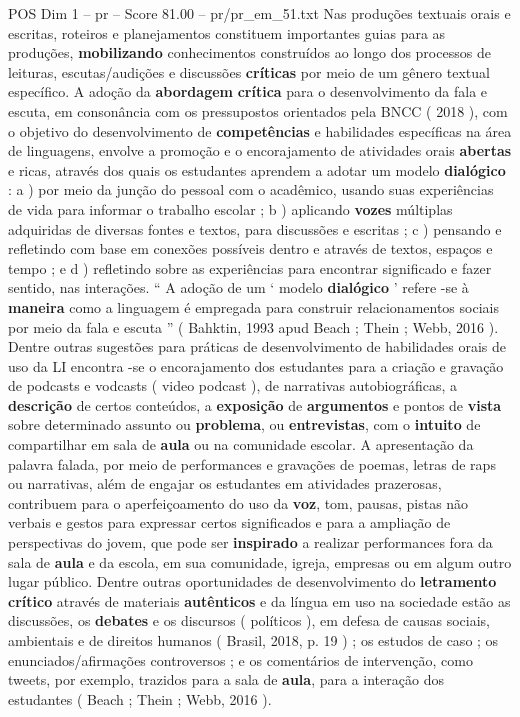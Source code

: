 \begin{textsample}{POS Dim 1 – pr – Score 81.00 – pr/pr\_em\_51.txt}
Nas produções textuais orais e escritas, roteiros e planejamentos constituem importantes guias para as produções, \textbf{mobilizando} conhecimentos construídos ao longo dos processos de leituras, escutas/audições e discussões \textbf{críticas} por meio de um gênero textual específico.
A adoção da \textbf{abordagem} \textbf{crítica} para o desenvolvimento da fala e escuta, em consonância com os pressupostos orientados pela BNCC ( 2018 ), com o objetivo do desenvolvimento de \textbf{competências} e habilidades específicas na área de linguagens, envolve a promoção e o encorajamento de atividades orais \textbf{abertas} e ricas, através dos quais os estudantes aprendem a adotar um modelo \textbf{dialógico} : a ) por meio da junção do pessoal com o acadêmico, usando suas experiências de vida para informar o trabalho escolar ; b ) aplicando \textbf{vozes} múltiplas adquiridas de diversas fontes e textos, para discussões e escritas ; c ) pensando e refletindo com base em conexões possíveis dentro e através de textos, espaços e tempo ; e d ) refletindo sobre as experiências para encontrar significado e fazer sentido, nas interações. “ A adoção de um ‘ modelo \textbf{dialógico} ’ refere -se à \textbf{maneira} como a linguagem é empregada para construir relacionamentos sociais por meio da fala e escuta ” ( Bahktin, 1993 apud Beach ; Thein ; Webb, 2016 ).
Dentre outras sugestões para práticas de desenvolvimento de habilidades orais de uso da LI encontra -se o encorajamento dos estudantes para a criação e gravação de podcasts e vodcasts ( video podcast ), de narrativas autobiográficas, a \textbf{descrição} de certos conteúdos, a \textbf{exposição} de \textbf{argumentos} e pontos de \textbf{vista} sobre determinado assunto ou \textbf{problema}, ou \textbf{entrevistas}, com o \textbf{intuito} de compartilhar em sala de \textbf{aula} ou na comunidade escolar.
A apresentação da palavra falada, por meio de performances e gravações de poemas, letras de raps ou narrativas, além de engajar os estudantes em atividades prazerosas, contribuem para o aperfeiçoamento do uso da \textbf{voz}, tom, pausas, pistas não verbais e gestos para expressar certos significados e para a ampliação de perspectivas do jovem, que pode ser \textbf{inspirado} a realizar performances fora da sala de \textbf{aula} e da escola, em sua comunidade, igreja, empresas ou em algum outro lugar público.
Dentre outras oportunidades de desenvolvimento do \textbf{letramento} \textbf{crítico} através de materiais \textbf{autênticos} e da língua em uso na sociedade estão as discussões, os \textbf{debates} e os discursos ( políticos ), em defesa de causas sociais, ambientais e de direitos humanos ( Brasil, 2018, p. 19 ) ; os estudos de caso ; os enunciados/afirmações controversos ; e os comentários de intervenção, como tweets, por exemplo, trazidos para a sala de \textbf{aula}, para a interação dos estudantes ( Beach ; Thein ; Webb, 2016 ).

\end{textsample}
